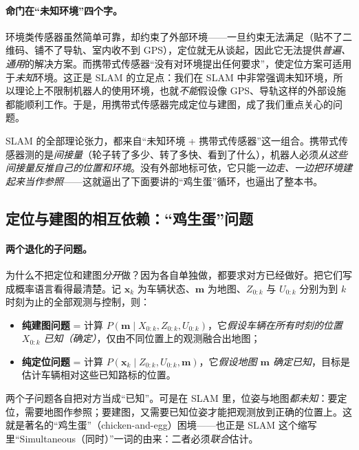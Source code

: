 \paragraph{命门在“未知环境”四个字。}
环境类传感器虽然简单可靠，却约束了外部环境——一旦约束无法满足（贴不了二维码、铺不了导轨、室内收不到 GPS），定位就无从谈起，因此它无法提供\emph{普遍、通用}的解决方案。而携带式传感器“没有对环境提出任何要求”，使定位方案可适用于\emph{未知}环境\cite{gaoxiang2019slam14}。这正是 SLAM 的立足点：我们在 SLAM 中非常强调未知环境，所以理论上不限制机器人的使用环境，也就\emph{不能}假设像 GPS、导轨这样的外部设施都能顺利工作。于是，用携带式传感器完成定位与建图，成了我们重点关心的问题。

\begin{insight}
SLAM 的全部理论张力，都来自“未知环境 + 携带式传感器”这一组合。携带式传感器测的是\emph{间接量}（轮子转了多少、转了多快、看到了什么），机器人必须\emph{从这些间接量反推自己的位置和环境}。没有外部地标可依，它只能\emph{一边走、一边把环境建起来当作参照}——这就逼出了下面要讲的“鸡生蛋”循环，也逼出了整本书。
\end{insight}

\subsection{定位与建图的相互依赖：“鸡生蛋”问题}
\label{sec:intro-chicken-egg}

\paragraph{两个退化的子问题。}
为什么不把定位和建图\emph{分开}做？因为各自单独做，都要求对方已经做好。把它们写成概率语言看得最清楚\cite{durrantwhyte2006slam}。记 $\mathbf{x}_k$ 为车辆状态、$\mathbf{m}$ 为地图、$Z_{0:k}$ 与 $U_{0:k}$ 分别为到 $k$ 时刻为止的全部观测与控制，则：

\begin{itemize}
  \item \textbf{纯建图问题} = 计算 $P(\mathbf{m}\mid X_{0:k},Z_{0:k},U_{0:k})$，它\emph{假设车辆在所有时刻的位置 $X_{0:k}$ 已知（确定）}，仅由不同位置上的观测融合出地图；
  \item \textbf{纯定位问题} = 计算 $P(\mathbf{x}_k\mid Z_{0:k},U_{0:k},\mathbf{m})$，它\emph{假设地图 $\mathbf{m}$ 确定已知}，目标是估计车辆相对这些已知路标的位置。
\end{itemize}

\noindent 两个子问题各自把对方当成“已知”。可是在 SLAM 里，位姿与地图\emph{都未知}：要定位，需要地图作参照；要建图，又需要已知位姿才能把观测放到正确的位置上。这就是著名的“鸡生蛋”（chicken-and-egg）困境——也正是 SLAM 这个缩写里“Simultaneous（同时）”一词的由来：二者必须\emph{联合}估计。

